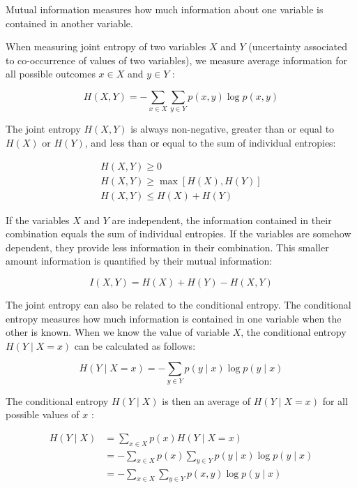 Mutual information measures how much information about one variable is contained in another variable.

When measuring joint entropy of two variables $X$ and $Y$ (uncertainty associated to co-occurrence of values of two variables), we measure average information for all possible outcomes $x \in X$ and $y \in Y$ :


\begin{equation*}
H(X, Y)=-\sum_{x \in X} \sum_{y \in Y} p(x, y) \log p(x, y) \tag{14.9}
\end{equation*}


The joint entropy $H(X, Y)$ is always non-negative, greater than or equal to $H(X)$ or $H(Y)$, and less than or equal to the sum of individual entropies:


\begin{gather*}
H(X, Y) \geq 0 \\
H(X, Y) \geq \max [H(X), H(Y)]  \tag{14.10}\\
H(X, Y) \leq H(X)+H(Y)
\end{gather*}


If the variables $X$ and $Y$ are independent, the information contained in their combination equals the sum of individual entropies. If the variables are somehow dependent, they provide less information in their combination. This smaller amount information is quantified by their mutual information:


\begin{equation*}
I(X, Y)=H(X)+H(Y)-H(X, Y) \tag{14.11}
\end{equation*}


The joint entropy can also be related to the conditional entropy. The conditional entropy measures how much information is contained in one variable when the other is known. When we know the value of variable $X$, the conditional entropy $H(Y \mid X=x)$ can be calculated as follows:


\begin{equation*}
H(Y \mid X=x)=-\sum_{y \in Y} p(y \mid x) \log p(y \mid x) \tag{14.12}
\end{equation*}


The conditional entropy $H(Y \mid X)$ is then an average of $H(Y \mid X=x)$ for all possible values of $x$ :


\begin{align*}
H(Y \mid X) & =\sum_{x \in X} p(x) H(Y \mid X=x) \\
& =-\sum_{x \in X} p(x) \sum_{y \in Y} p(y \mid x) \log p(y \mid x)  \tag{14.13}\\
& =-\sum_{x \in X} \sum_{y \in Y} p(x, y) \log p(y \mid x)
\end{align*}


